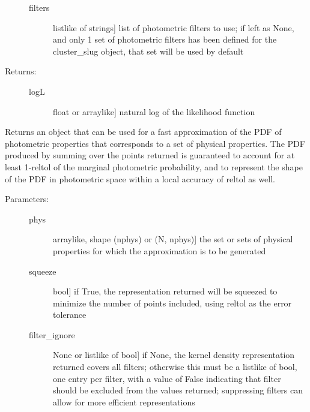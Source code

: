 \documentclass[letterpaper,10pt,english]{sphinxmanual}
\begin{document}
\begin{fulllineitems}
\begin{fulllineitems}
\begin{description}
\begin{description}
\item[{filters}] \leavevmode{[}listlike of strings{]}
list of photometric filters to use; if left as None, and
only 1 set of photometric filters has been defined for
the cluster\_slug object, that set will be used by
default

\end{description}

\item[{Returns:}] \leavevmode\begin{description}
\item[{logL}] \leavevmode{[}float or arraylike{]}
natural log of the likelihood function

\end{description}

\end{description}

\end{fulllineitems}


\begin{fulllineitems}
\label{\detokenize{cluster_slug:slugpy.cluster_slug.cluster_slug.make_approx_phot}}
Returns an object that can be used for a fast approximation of
the PDF of photometric properties that corresponds to a set of
physical properties. The PDF produced by summing over the
points returned is guaranteed to account for at least 1-reltol
of the marginal photometric probability, and to represent the
shape of the PDF in photometric space within a local accuracy
of reltol as well.
\begin{description}
\item[{Parameters:}] \leavevmode\begin{description}
\item[{phys}] \leavevmode{[}arraylike, shape (nphys) or (N, nphys){]}
the set or sets of physical properties for which the
approximation is to be generated

\item[{squeeze}] \leavevmode{[}bool{]}
if True, the representation returned will be squeezed to
minimize the number of points included, using reltol as
the error tolerance

\item[{filter\_ignore}] \leavevmode{[}None or listlike of bool{]}
if None, the kernel density representation returned
covers all filters; otherwise this must be a listlike of
bool, one entry per filter, with a value of False
indicating that filter should be excluded from the
values returned; suppressing filters can allow for more
efficient representations


\end{description}
\end{description}
\end{fulllineitems}
\end{fulllineitems}
\end{document}
